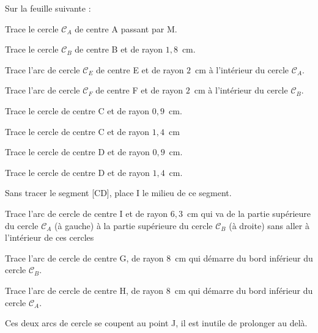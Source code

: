 Sur la feuille suivante :
\begin{myenumerate}	
	\item Trace le cercle $\mathscr{C}_A$ de centre A passant par M.
\vspace{0.2cm}	
	\item Trace le cercle $\mathscr{C}_B$ de centre B et de rayon $1,8$~cm.
\vspace{0.2cm}	
	\item Trace l'arc de cercle $\mathscr{C}_E$ de centre E et de rayon $2$~cm à l'intérieur du cercle $\mathscr{C}_A$.
\vspace{0.2cm}	
	\item Trace l'arc de cercle $\mathscr{C}_F$ de centre F et de rayon $2$~cm à l'intérieur du cercle $\mathscr{C}_B$.
\vspace{0.2cm}
	\item Trace le cercle de centre C et de rayon $0,9$~cm. 
\vspace{0.2cm}	
	\item Trace le cercle de centre C et de rayon $1,4$~cm
\vspace{0.2cm}	
	\item Trace le cercle de centre D et de rayon $0,9$~cm. 
\vspace{0.2cm}	
	\item Trace le cercle de centre D et de rayon $1,4$~cm.
\vspace{0.2cm}
	\item Sans tracer le segment [CD], place I le milieu de ce segment.
\vspace{0.2cm}
	\item Trace l'arc de cercle de centre I et de rayon $6,3$~cm qui va de la partie supérieure du cercle $\mathscr{C}_A$ (à gauche) à la partie supérieure du cercle $\mathscr{C}_B$ (à droite) sans aller à l'intérieur de ces cercles
\vspace{0.2cm}
	\item Trace l'arc de cercle de centre G, de rayon $8$~cm qui démarre du bord inférieur du cercle $\mathscr{C}_B$.
\vspace{0.2cm}	
	\item Trace l'arc de cercle de centre H, de rayon $8$~cm qui démarre du bord inférieur du cercle $\mathscr{C}_A$.
\vspace{0.2cm}	
	\item Ces deux arcs de cercle se coupent au point J, il est inutile de prolonger au delà.  

\end{myenumerate}
